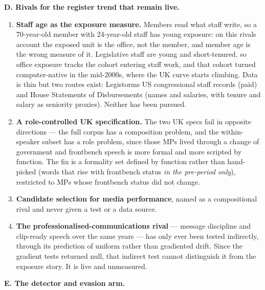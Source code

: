 \textbf{D. Rivals for the register trend that remain live.}

\begin{enumerate}
\def\labelenumi{\arabic{enumi}.}
\setcounter{enumi}{16}
\tightlist
\item
  \textbf{Staff age as the exposure measure.} Members read what staff write, so
  a 70-year-old member with 24-year-old staff has young exposure: on this
  rival\textquotesingle s account the exposed unit is the office, not the member, and member
  age is the wrong measure of it. Legislative staff are young and
  short-tenured, so office exposure tracks the cohort entering staff work,
  and that cohort turned computer-native in the mid-2000s, where the UK
  curve starts climbing. Data is thin but two routes exist: Legistorm\textquotesingle s US
  congressional staff records (paid) and House Statements of Disbursements
  (names and salaries, with tenure and salary as seniority proxies). Neither
  has been pursued.
\item
  \textbf{A role-controlled UK specification.} The two UK specs fail in opposite
  directions --- the full corpus has a composition problem, and the
  within-speaker subset has a role problem, since those MPs lived through a
  change of government and frontbench speech is more formal and more scripted
  by function. The fix is a formality set defined by function rather than
  hand-picked (words that rise with frontbench status \emph{in the pre-period
  only}), restricted to MPs whose frontbench status did not change.
\item
  \textbf{Candidate selection for media performance}, named as a compositional
  rival and never given a test or a data source.
\item
  \textbf{The professionalised-communications rival} --- message discipline and
  clip-ready speech over the same years --- has only ever been tested
  indirectly, through its prediction of uniform rather than gradiented drift.
  Since the gradient tests returned null, that indirect test cannot
  distinguish it from the exposure story. It is live and unmeasured.
\end{enumerate}

\textbf{E. The detector and evasion arm.}

